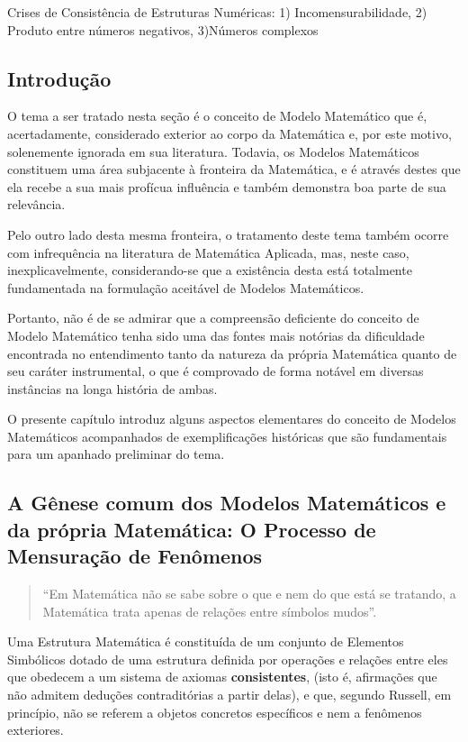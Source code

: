     Crises de Consistência de Estruturas Numéricas: 1) Incomensurabilidade, 2) Produto entre números negativos, 3)Números complexos

\subsection{Introdução}

    O tema a ser tratado nesta seção é o conceito de Modelo Matemático que é, acertadamente, considerado exterior ao corpo da Matemática e, por este motivo, solenemente ignorada em sua literatura. Todavia, os Modelos Matemáticos constituem uma área subjacente à fronteira da Matemática, e é através destes que ela recebe a sua mais profícua influência e também demonstra boa parte de sua relevância.
    
    Pelo outro lado desta mesma fronteira, o tratamento deste tema também ocorre com infrequência na literatura de Matemática Aplicada, mas, neste caso, inexplicavelmente, considerando-se que a existência desta está totalmente fundamentada na formulação aceitável de Modelos Matemáticos.
    
    Portanto, não é de se admirar que a compreensão deficiente do conceito de Modelo Matemático tenha sido uma das fontes mais notórias da dificuldade encontrada no entendimento tanto da natureza da própria Matemática quanto de seu caráter instrumental, o que é comprovado de forma notável em diversas instâncias na longa história de ambas.
    
    O presente capítulo introduz alguns aspectos elementares do conceito de Modelos Matemáticos acompanhados de exemplificações históricas que são fundamentais para um apanhado preliminar do tema.

\subsection{A Gênese comum dos Modelos Matemáticos e da própria Matemática: O Processo de Mensuração de Fenômenos}

\begin{quote}
    ``Em Matemática não se sabe sobre o que e nem do que está se tratando, a Matemática trata apenas de relações entre símbolos mudos''.
    
\end{quote}

    Uma Estrutura Matemática é constituída de um conjunto de Elementos Simbólicos dotado de uma estrutura definida por operações e relações entre eles que obedecem a um sistema de axiomas \textbf{consistentes}, (isto é, afirmações que não admitem deduções contraditórias a partir delas), e que, segundo Russell, em princípio, não se referem a objetos concretos específicos e nem a fenômenos exteriores.
    
